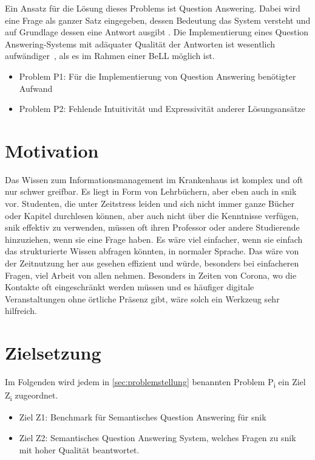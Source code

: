 Ein Ansatz für die Lösung dieses Problems ist Question Answering.
Dabei wird eine Frage als ganzer Satz eingegeben, dessen Bedeutung das System versteht und auf Grundlage dessen eine Antwort ausgibt \citep{qadefinition}.
Die Implementierung eines Question Answering-Systems mit adäquater Qualität der Antworten ist wesentlich aufwändiger~\citep[S.~3]{qanswer}, als es im Rahmen einer BeLL möglich ist.

\begin{itemize}
	\item Problem P1: Für die Implementierung von Question Answering benötigter Aufwand
	\item Problem P2: Fehlende Intuitivität und Expressivität anderer Lösungsansätze
\end{itemize}

\section{Motivation}

Das Wissen zum Informationsmanagement im Krankenhaus ist komplex und oft nur schwer greifbar.
Es liegt in Form von Lehrbüchern, aber eben auch in \acs{snik} vor.
Studenten, die unter Zeitstress leiden und sich nicht immer ganze Bücher oder Kapitel durchlesen können, aber auch nicht über die Kenntnisse verfügen, \acs{snik} effektiv zu verwenden,
müssen oft ihren Professor oder andere Studierende hinzuziehen, wenn sie eine Frage haben.
Es wäre viel einfacher, wenn sie einfach das strukturierte Wissen abfragen könnten, in normaler Sprache.
Das wäre von der Zeitnutzung her aus gesehen effizient und würde, besonders bei einfacheren Fragen, viel Arbeit von allen nehmen.
Besonders in Zeiten von Corona, wo die Kontakte oft eingeschränkt werden müssen und es häufiger digitale Veranstaltungen ohne örtliche Präsenz gibt, wäre solch ein Werkzeug sehr hilfreich.

\section{Zielsetzung}\label{sec:zielsetzung}

Im Folgenden wird jedem in \cref{sec:problemstellung} benannten Problem P\textsubscript{i} ein Ziel Z\textsubscript{i} zugeordnet.

	\begin{itemize}
		\item Ziel Z1: Benchmark für Semantisches Question Answering für \acs{snik}
		\item Ziel Z2: Semantisches Question Answering System, welches Fragen zu \acs{snik} mit hoher Qualität beantwortet.
	\end{itemize}
